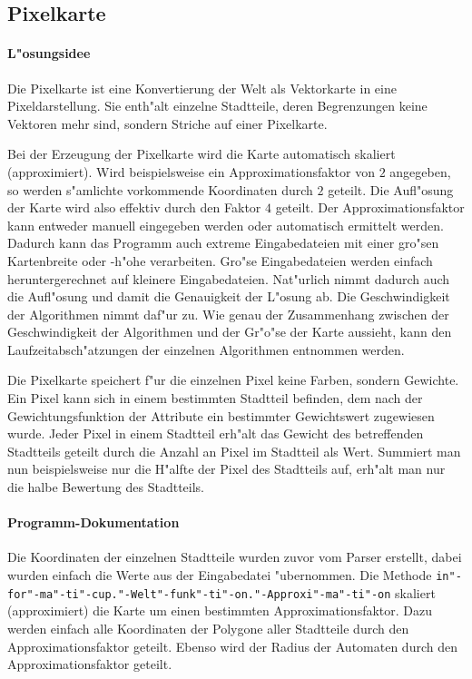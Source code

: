 \subsection{Pixelkarte}
\paragraph{L"osungsidee}
Die Pixelkarte ist eine Konvertierung der Welt als Vektorkarte in eine Pixeldarstellung. Sie enth"alt einzelne Stadtteile, deren Begrenzungen keine Vektoren mehr sind, sondern Striche auf einer Pixelkarte. 

Bei der Erzeugung der Pixelkarte wird die Karte automatisch skaliert (approximiert). Wird beispielsweise ein Approximationsfaktor von \(2\) angegeben, so werden s"amlichte vorkommende Koordinaten durch \(2\) geteilt. Die Aufl"osung der Karte wird also effektiv durch den Faktor \(4\) geteilt. Der Approximationsfaktor kann entweder manuell eingegeben werden oder automatisch ermittelt werden. Dadurch kann das Programm auch extreme Eingabedateien mit einer gro"sen Kartenbreite oder -h"ohe verarbeiten. Gro"se Eingabedateien werden einfach heruntergerechnet auf kleinere Eingabedateien. Nat"urlich nimmt dadurch auch die Aufl"osung und damit die Genauigkeit der L"osung ab. Die Geschwindigkeit der Algorithmen nimmt daf"ur zu. Wie genau der Zusammenhang zwischen der Geschwindigkeit der Algorithmen und der Gr"o"se der Karte aussieht, kann den Laufzeitabsch"atzungen der einzelnen Algorithmen entnommen werden.

Die Pixelkarte speichert f"ur die einzelnen Pixel keine Farben, sondern Gewichte. Ein Pixel kann sich in einem bestimmten Stadtteil befinden, dem nach der Gewichtungsfunktion der Attribute ein bestimmter Gewichtswert zugewiesen wurde. Jeder Pixel in einem Stadtteil erh"alt das Gewicht des betreffenden Stadtteils geteilt durch die Anzahl an Pixel im Stadtteil als Wert. Summiert man nun beispielsweise nur die H"alfte der Pixel des Stadtteils auf, erh"alt man nur die halbe Bewertung des Stadtteils.

\paragraph{Programm-Dokumentation}
Die Koordinaten der einzelnen Stadtteile wurden zuvor vom Parser erstellt, dabei wurden einfach die Werte aus der Eingabedatei "ubernommen. Die Methode \texttt{in"-for"-ma"-ti"-cup."-Welt"-funk"-ti"-on."-Approxi"-ma"-ti"-on} skaliert (approximiert) die Karte um einen bestimmten Approximationsfaktor. Dazu werden einfach alle Koordinaten der Polygone aller Stadtteile durch den Approximationsfaktor geteilt. Ebenso wird der Radius der Automaten durch den Approximationsfaktor geteilt. 

